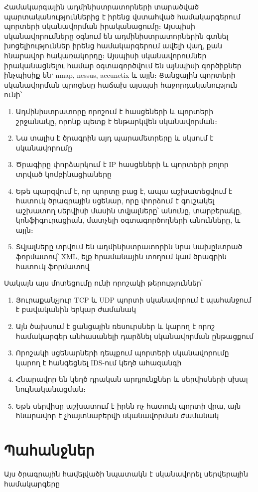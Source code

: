 \documentclass[11pt]{article}
\begin{document}
\begin{sloppypar}
Համակարգային ադմինիստրատորների տարածված պարտականություններից է իրենց
վստահված համակարգերում պորտերի սկանավորման իրականացումը։
Այսպիսի սկանավորումները օգնում են ադմինիստրատորներին գտնել խոցելիություններ
իրենց համակարգերում ավելի վաղ, քան հնարավոր հակառակորդը։
Այսպիսի սկանավորումներ իրականացնելու համար օգտագործվում են այնպիսի
գործիքներ ինչպիսիք են` nmap, nessus, accunetix և այլն։
Ցանցային պորտերի սկանավորման պրոցեսը հաճախ այսպսի հաջորդականություն ունի՝

\begin{enumerate}
\item Ադմինիստրատորը որոշում է հասցեների և պորտերի շրջանակը, որոնք պետք է
    ենթարկվեն սկանավորման։
\item Նա տալիս է ծրագրին այդ պարամետրերը և սկսում է սկանավորումը
\item Ծրագիրը փորձարկում է IP հասցեների և պորտերի բոլոր տրված
    կոմբինացիաները
\item Եթե պարզվում է, որ պորտը բաց է, ապա աշխատեցվում է հատուկ ծրագրային
    սցենար, որը փորձում է գուշակել աշխատող սերվիսի մասին տվյալները՝
    անունը, տարբերակը, կոնֆիգուրացիան, մատչելի օգտագործողների անունները,
    և այլն։
\item Տվյալները տրվում են ադմինիստրատորին նրա նախընտրած ֆորմատով՝
    XML, ելք հրամանային տողում կամ ծրագրին հատուկ ֆորմատով
\end{enumerate}

Սակայն այս մոտեցումը ունի որոշակի թերություններ՝

\begin{enumerate}
\item Յուրաքանչյուր TCP և UDP պորտի սկանավորում է պահանջում է
    բավականին երկար ժամանակ
\item Այն ծախսում է ցանցային ռեսուրսներ և կարող է որոշ համակարգեր
    անհասանելի դարձնել սկանավորման ընթացքում
\item Որոշակի սցենարների դեպքում պորտերի սկանավորումը կարող է
    հանգեցնել IDS-ում կեղծ ահազանգի
\item Հնարավոր են կեղծ դրական արդյունքներ և սերվիսների սխալ նույնականացման։
\item Եթե սերվիսը աշխատում է իրեն ոչ հատուկ պորտի վրա, այն հնարավոր է
    չհայտնաբերվի սկանավորման ժամանակ
\end{enumerate}


\section{Պահանջներ}

Այս ծրագրային հավելվածի նպատակն է սկանավորել սերվերային համակարգերը


\end{sloppypar}
\end{document}
